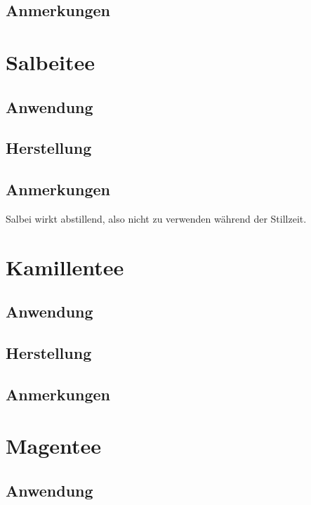 \subsection{Anmerkungen}




\section{Salbeitee}

\subsection{Anwendung}

\subsection{Herstellung}

\subsection{Anmerkungen}

Salbei wirkt abstillend, also nicht zu verwenden während der Stillzeit.




\section{Kamillentee}

\subsection{Anwendung}

\subsection{Herstellung}

\subsection{Anmerkungen}






\section{Magentee}

\subsection{Anwendung}

